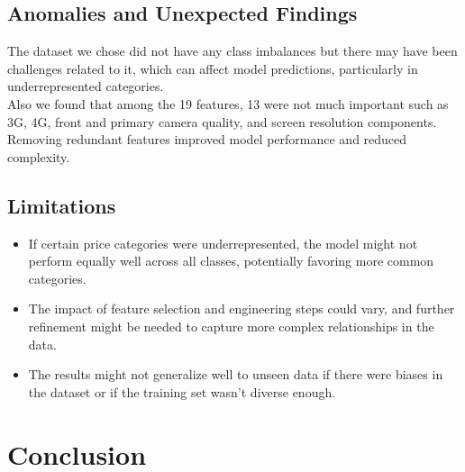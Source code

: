 \documentclass[12pt]{report}
\begin{document}
\section{Anomalies and Unexpected Findings}
The dataset we chose did not have any class imbalances but there may have been challenges related to it, which can affect model predictions, particularly in underrepresented categories. \\
Also we found that among the 19 features, 13 were not much important such as 3G, 4G, front and primary camera quality, and screen resolution components. Removing redundant features improved model performance and reduced complexity. \\	
\section{Limitations}
\vspace{-0.5em}
\begin{itemize}
	\setlength\itemsep{-1.25em}
	\item  If certain price categories were underrepresented, the model might not perform equally well across all classes, potentially favoring more common categories.
	\item The impact of feature selection and engineering steps could vary, and further refinement might be needed to capture more complex relationships in the data.
	\item The results might not generalize well to unseen data if there were biases in the dataset or if the training set wasn't diverse enough.
\end{itemize}

\chapter{Conclusion}
\end{document}
